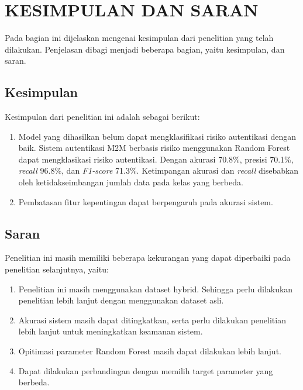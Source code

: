 \chapter{KESIMPULAN DAN SARAN}
Pada bagian ini dijelaskan mengenai kesimpulan dari penelitian yang telah dilakukan. Penjelasan dibagi menjadi beberapa bagian, yaitu kesimpulan, dan saran.

\section{Kesimpulan}
Kesimpulan dari penelitian ini adalah sebagai berikut:
\begin{enumerate}
    \item Model yang dihasilkan belum dapat mengklasifikasi risiko autentikasi dengan baik. Sistem autentikasi M2M berbasis risiko menggunakan Random Forest dapat mengklasikasi risiko autentikasi. Dengan akurasi 70.8\%, presisi 70.1\%, \textit{recall} 96.8\%, dan \textit{F1-score} 71.3\%. Ketimpangan akurasi dan \textit{recall} disebabkan oleh ketidakseimbangan jumlah data pada kelas yang berbeda.
    \item Pembatasan fitur kepentingan dapat berpengaruh pada akurasi sistem.
\end{enumerate}


\section{Saran}
Penelitian ini masih memiliki beberapa kekurangan yang dapat diperbaiki pada penelitian selanjutnya, yaitu:
\begin{enumerate}
    \item Penelitian ini masih menggunakan dataset hybrid. Sehingga perlu dilakukan penelitian lebih lanjut dengan menggunakan dataset asli.
    \item Akurasi sistem masih dapat ditingkatkan, serta perlu dilakukan penelitian lebih lanjut untuk meningkatkan keamanan sistem.
    \item Opitimasi parameter Random Forest masih dapat dilakukan lebih lanjut.
    \item Dapat dilakukan perbandingan dengan memilih target parameter yang berbeda.
\end{enumerate}
